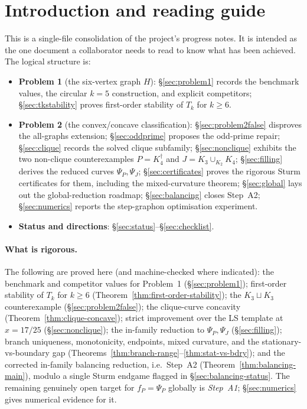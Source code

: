 \documentclass[11pt]{amsart}
\theoremstyle{definition}
\newcommand{\1}{\mathbf 1}
\begin{document}
\maketitle

\tableofcontents

\section{Introduction and reading guide}
\label{sec:intro}

This is a single-file consolidation of the project's progress notes.  It is
intended as the one document a collaborator needs to read to know what has been
achieved.  The logical structure is:

\begin{itemize}[itemsep=3pt]
\item \textbf{Problem 1} (the six-vertex graph $H$): \S\ref{sec:problem1} records
the benchmark values, the circular $k=5$ construction, and explicit competitors;
\S\ref{sec:tkstability} proves first-order stability of $T_k$ for $k\ge 6$.
\item \textbf{Problem 2} (the convex/concave classification):
\S\ref{sec:problem2false} disproves the all-graphs extension;
\S\ref{sec:oddprime} proposes the odd-prime repair;
\S\ref{sec:clique} records the solved clique subfamily;
\S\ref{sec:nonclique} exhibits the two non-clique counterexamples
$P=K_4^\dagger$ and $J=K_3\cup_{K_2}K_4$;
\S\ref{sec:filling} derives the reduced curves $\Psi_P,\Psi_J$;
\S\ref{sec:certificates} proves the rigorous Sturm certificates for them,
including the mixed-curvature theorem;
\S\ref{sec:global} lays out the global-reduction roadmap;
\S\ref{sec:balancing} closes Step~A2;
\S\ref{sec:numerics} reports the step-graphon optimisation experiment.
\item \textbf{Status and directions}: \S\ref{sec:status}--\S\ref{sec:checklist}.
\end{itemize}

\paragraph{What is rigorous.}  The following are proved here (and machine-checked
where indicated): the benchmark and competitor values for Problem~1
(\S\ref{sec:problem1}); first-order stability of $T_k$ for $k\ge6$
(Theorem~\ref{thm:first-order-stability}); the $K_3\sqcup K_3$ counterexample
(\S\ref{sec:problem2false}); the clique-curve concavity
(Theorem~\ref{thm:clique-concave}); strict improvement over the LS template at
$x=17/25$ (\S\ref{sec:nonclique}); the in-family reduction to $\Psi_P,\Psi_J$
(\S\ref{sec:filling}); branch uniqueness, monotonicity, endpoints, mixed
curvature, and the stationary-vs-boundary gap
(Theorems~\ref{thm:branch-range}--\ref{thm:stat-vs-bdry}); and the corrected
in-family balancing reduction, i.e.\ Step~A2
(Theorem~\ref{thm:balancing-main}), modulo a single Sturm endgame flagged in
\S\ref{sec:balancing-status}.  The remaining genuinely open target for
$f_P=\Psi_P$ globally is \emph{Step~A1}; \S\ref{sec:numerics} gives numerical
evidence for it.
\end{document}
